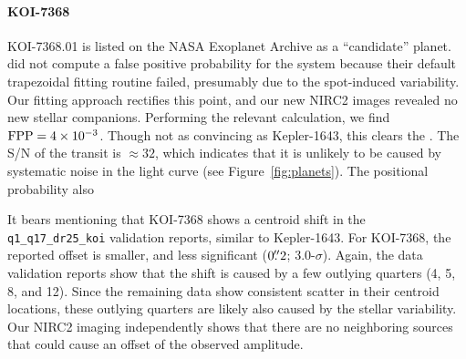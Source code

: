 \documentclass[12pt,twocolumn,tighten,linenumbers,trackchanges]{aastex63}
\begin{document}
\paragraph{KOI-7368}
KOI-7368.01 is listed on the NASA Exoplanet Archive as a ``candidate''
planet.  \citet{morton_false_2016} did not compute a false positive
probability for the system because their default trapezoidal fitting
routine failed, presumably due to the spot-induced variability.  Our
fitting approach rectifies this point, and our new NIRC2 images
revealed no new stellar companions.  Performing the relevant
calculation, we find ${\rm FPP} = 4\times10^{-3}$.  Though not
as convincing as Kepler-1643, this clears the .  The S/N of the transit is
$\approx$$32$, which indicates that it is unlikely to be caused by
systematic noise in the light curve (see Figure~\ref{fig:planets}).
The positional probability also 

It bears mentioning that KOI-7368 shows a centroid shift in the
\texttt{q1\_q17\_dr25\_koi} validation reports, similar to
Kepler-1643.  For KOI-7368, the reported offset is smaller, and less
significant ($0\mbox{$.\!\!^{\prime\prime}$}2$; 3.0-$\sigma$).  Again, the
data validation reports show that the shift is caused by a few
outlying quarters (4, 5, 8, and 12).  Since the remaining data show
consistent scatter in their centroid locations, these outlying
quarters are likely also caused by the stellar variability.
Our NIRC2 imaging independently shows that there are no neighboring sources that could cause an offset of the observed
amplitude.
\end{document}
